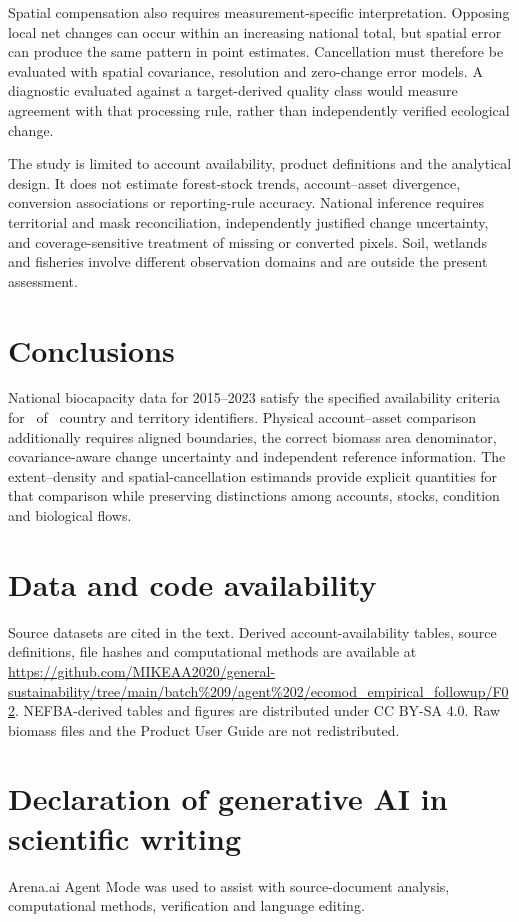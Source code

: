 \documentclass[11pt,a4paper]{article}
\begin{document}
Spatial compensation also requires measurement-specific interpretation. Opposing local net changes can occur within an increasing national total, but spatial error can produce the same pattern in point estimates. Cancellation must therefore be evaluated with spatial covariance, resolution and zero-change error models. A diagnostic evaluated against a target-derived quality class would measure agreement with that processing rule, rather than independently verified ecological change.

The study is limited to account availability, product definitions and the analytical design. It does not estimate forest-stock trends, account--asset divergence, conversion associations or reporting-rule accuracy. National inference requires territorial and mask reconciliation, independently justified change uncertainty, and coverage-sensitive treatment of missing or converted pixels. Soil, wetlands and fisheries involve different observation domains and are outside the present assessment.

\section{Conclusions}
National biocapacity data for 2015--2023 satisfy the specified availability criteria for \AccountPass\ of \CountryIDs\ country and territory identifiers. Physical account--asset comparison additionally requires aligned boundaries, the correct biomass area denominator, covariance-aware change uncertainty and independent reference information. The extent--density and spatial-cancellation estimands provide explicit quantities for that comparison while preserving distinctions among accounts, stocks, condition and biological flows.

\section*{Data and code availability}
Source datasets are cited in the text. Derived account-availability tables, source definitions, file hashes and computational methods are available at \url{https://github.com/MIKEAA2020/general-sustainability/tree/main/batch%209/agent%202/ecomod_empirical_followup/F02}. NEFBA-derived tables and figures are distributed under CC BY-SA 4.0. Raw biomass files and the Product User Guide are not redistributed.

\section*{Declaration of generative AI in scientific writing}
Arena.ai Agent Mode was used to assist with source-document analysis, computational methods, verification and language editing.
\end{document}
